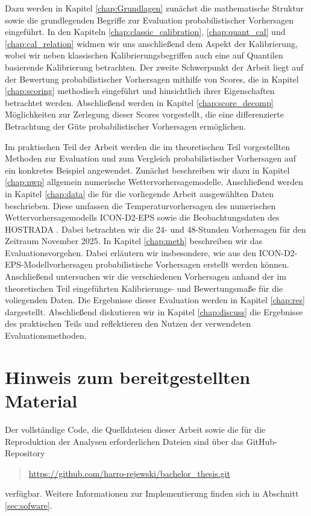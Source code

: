 Dazu werden in Kapitel \ref{chap:Grundlagen} zunächst die mathematische Struktur sowie die grundlegenden Begriffe zur Evaluation probabilistischer Vorhersagen eingeführt. In den Kapiteln \ref{chap:classic_calibration}, \ref{chap:quant_cal} und \ref{chap:cal_relation} widmen wir uns anschließend dem Aspekt der Kalibrierung, wobei wir neben klassischen Kalibrierungsbegriffen auch eine auf Quantilen basierende Kalibrierung betrachten. Der zweite Schwerpunkt der Arbeit liegt auf der Bewertung probabilistischer Vorhersagen mithilfe von Scores, die in Kapitel \ref{chap:scoring} methodisch eingeführt und hinsichtlich ihrer Eigenschaften betrachtet werden. Abschließend werden in Kapitel \ref{chap:score_decomp} Möglichkeiten zur Zerlegung dieser Scores vorgestellt, die eine differenzierte Betrachtung der Güte probabilistischer Vorhersagen ermöglichen. 

Im praktischen Teil der Arbeit werden die im theoretischen Teil vorgestellten Methoden zur Evaluation und zum Vergleich probabilistischer Vorhersagen auf ein konkretes Beispiel angewendet. Zunächst beschreiben wir dazu in Kapitel \ref{chap:nwp} allgemein numerische Wettervorhersagemodelle. Anschließend werden in Kapitel \ref{chap:data} die für die vorliegende Arbeit ausgewählten Daten beschrieben. Diese umfassen die Temperaturvorhersagen des numerischen Wettervorhersagemodells ICON-D2-EPS \parencite{reinert2025icon_dwd} sowie die Beobachtungsdaten des HOSTRADA \parencite{krahenmann_high-resolution_2018}. Dabei betrachten wir die 24- und 48-Stunden Vorhersagen für den Zeitraum November 2025. In Kapitel \ref{chap:meth} beschreiben wir das Evaluationsvorgehen. Dabei erläutern wir insbesondere, wie aus den ICON-D2-EPS-Modellvorhersagen probabilistische Vorhersagen erstellt werden können. Anschließend untersuchen wir die verschiedenen Vorhersagen anhand der im theoretischen Teil eingeführten Kalibrierungs- und Bewertungsmaße für die voliegenden Daten. Die Ergebnisse dieser Evaluation werden in Kapitel \ref{chap:res} dargestellt. Abschließend diskutieren wir in Kapitel \ref{chap:discuss} die Ergebnisse des praktischen Teils und reflektieren den Nutzen der verwendeten Evaluationsmethoden.

\section{Hinweis zum bereitgestellten Material}
\label{sec:material}
Der vollständige Code, die Quelldateien dieser Arbeit sowie die für die Reproduktion der Analysen erforderlichen Dateien sind über das GitHub-Repository
\begin{quote}
    \url{https://github.com/harro-rejewski/bachelor_thesis.git}
\end{quote}
verfügbar. Weitere Informationen zur Implementierung finden sich in Abschnitt \ref{sec:sofware}.
